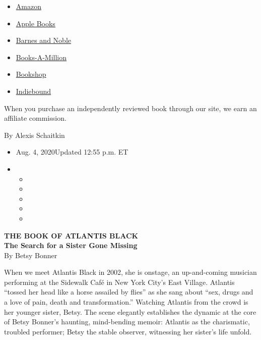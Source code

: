 \begin{itemize}
\tightlist
\item
  \href{https://www.amazon.com/gp/search?index=books\&tag=NYTBSREV-20\&field-keywords=The+Book+of+Atlantis+Black+Betsy+Bonner}{Amazon}
\item
  \href{https://du-gae-books-dot-nyt-du-prd.appspot.com/buy?title=The+Book+of+Atlantis+Black\&author=Betsy+Bonner}{Apple
  Books}
\item
  \href{https://www.anrdoezrs.net/click-7990613-11819508?url=https\%3A\%2F\%2Fwww.barnesandnoble.com\%2Fw\%2F\%3Fean\%3D9781947793774}{Barnes
  and Noble}
\item
  \href{https://www.anrdoezrs.net/click-7990613-35140?url=https\%3A\%2F\%2Fwww.booksamillion.com\%2Fp\%2FThe\%2BBook\%2Bof\%2BAtlantis\%2BBlack\%2FBetsy\%2BBonner\%2F9781947793774}{Books-A-Million}
\item
  \href{https://bookshop.org/a/3546/9781947793774}{Bookshop}
\item
  \href{https://www.indiebound.org/book/9781947793774?aff=NYT}{Indiebound}
\end{itemize}

When you purchase an independently reviewed book through our site, we
earn an affiliate commission.

By Alexis Schaitkin

\begin{itemize}
\item
  Aug. 4, 2020Updated 12:55 p.m. ET
\item
  \begin{itemize}
  \item
  \item
  \item
  \item
  \item
  \end{itemize}
\end{itemize}

\textbf{THE BOOK OF ATLANTIS BLACK}\\
\textbf{The Search for a Sister Gone Missing}\\
By Betsy Bonner

When we meet Atlantis Black in 2002, she is onstage, an up-and-coming
musician performing at the Sidewalk Café in New York City's East
Village. Atlantis ``tossed her head like a horse assailed by flies'' as
she sang about ``sex, drugs and a love of pain, death and
transformation.'' Watching Atlantis from the crowd is her younger
sister, Betsy. The scene elegantly establishes the dynamic at the core
of Betsy Bonner's haunting, mind-bending memoir: Atlantis as the
charismatic, troubled performer; Betsy the stable observer, witnessing
her sister's life unfold.

